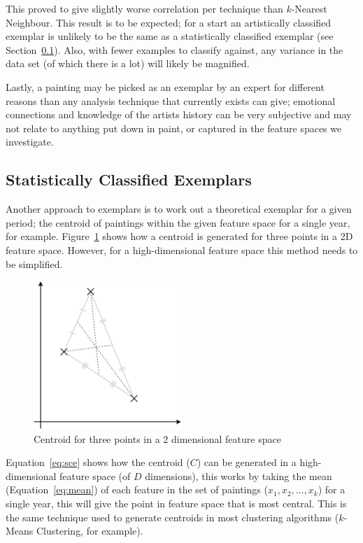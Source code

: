 This proved to give slightly worse correlation per technique than $k$-Nearest Neighbour. This 
result is to be expected; for a start an artistically classified exemplar is unlikely to be the
same as a statistically classified exemplar (see Section~\ref{sec:sce}). Also, with fewer examples
to classify against, any variance in the data set (of which there is a lot) will likely be 
magnified.

Lastly, a painting may be picked as an exemplar by an expert for different reasons than any
analysis technique that currently exists can give; emotional connections and knowledge of the
artists history can be very subjective and may not relate to anything put down in paint, or 
captured in the feature spaces we investigate.


\subsection{Statistically Classified Exemplars}\label{sec:sce}

Another approach to exemplars is to work out a theoretical exemplar for a given period; the 
centroid of paintings within the given feature space for a single year, for example. 
Figure~\ref{fig:centroid} shows how a centroid is generated for three points in a 2D feature
space. However, for a high-dimensional feature space this method needs to be simplified.

\begin{figure}[h]
\centering
\includegraphics[width=0.5\textwidth]{img/centroid.pdf}
\caption{Centroid for three points in a 2 dimensional feature space}\label{fig:centroid}
\end{figure}

Equation~\ref{eq:sce} shows how the centroid ($C$) can be generated in a high-dimensional feature 
space (of $D$ dimensions), this works by taking the mean (Equation~\ref{eq:mean}) of each feature 
in the set of paintings ($x_1, x_2,\dotsc,x_k$) for a single year, this will give the point in 
feature space that is most central. This is the same technique used to generate centroids in most 
clustering algorithms ($k$-Means Clustering, for example).

